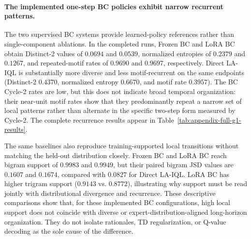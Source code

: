 \documentclass[manuscript,review,anonymous]{acmart}
\begin{document}
\paragraph{The implemented one-step BC policies exhibit narrow recurrent patterns.}
The two supervised BC systems provide learned-policy references rather than
single-component ablations. In the completed runs, Frozen BC and LoRA BC obtain
Distinct-2 values of $0.0694$ and
$0.0539$, normalized entropies of $0.2379$ and $0.1267$, and repeated-motif
rates of $0.9690$ and $0.9697$, respectively. Direct LA-IQL is substantially
more diverse and less motif-recurrent on the same endpoints (Distinct-2
$0.4370$, normalized entropy $0.6670$, and motif rate $0.3957$). The BC
Cycle-2 rates are low, but this does not indicate broad temporal organization:
their near-unit motif rates show that they predominantly repeat a narrow set of
local patterns rather than alternate in the specific two-step form measured by
Cycle-2. The complete recurrence results appear in
Table~\ref{tab:appendix-full-g1-results}.

The same baselines also reproduce training-supported local transitions without
matching the held-out distribution closely. Frozen BC and LoRA BC reach bigram
support of $0.9983$ and $0.9949$, but their paired bigram JSD values are
$0.1607$ and $0.1674$, compared with $0.0827$ for Direct LA-IQL. LoRA BC has
higher trigram support ($0.9143$ vs. $0.8772$), illustrating why support must be
read jointly with distributional divergence and recurrence. These descriptive
comparisons show that, for these implemented BC configurations, high local
support does not coincide with diverse or expert-distribution-aligned
long-horizon organization. They do not isolate rationales, TD regularization,
or Q-value decoding as the sole cause of the difference.
\end{document}
